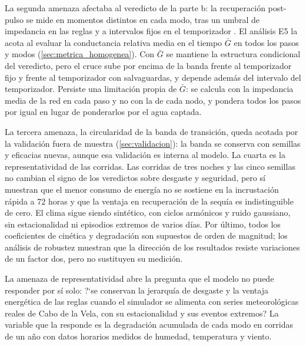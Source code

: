 La segunda amenaza afectaba al veredicto de la parte b: la recuperaci\'on post-pulso se mide en momentos distintos en cada modo, tras un umbral de impedancia en las reglas y a intervalos fijos en el temporizador \parencite[doc.~04, \S~7.5]{axioma2026engine}. El an\'alisis E5 la acota al evaluar la conductancia relativa media en el tiempo $\bar{G}$ en todos los pasos y modos (\cref{sec:metrica_homogenea}). Con $\bar{G}$ se mantiene la estructura condicional del veredicto, pero el cruce sube por encima de la banda frente al temporizador fijo y frente al temporizador con salvaguardas, y depende adem\'as del intervalo del temporizador. Persiste una limitaci\'on propia de $\bar{G}$: se calcula con la impedancia media de la red en cada paso y no con la de cada nodo, y pondera todos los pasos por igual en lugar de ponderarlos por el agua captada.

La tercera amenaza, la circularidad de la banda de transici\'on, queda acotada por la validaci\'on fuera de muestra (\cref{sec:validacion}): la banda se conserva con semillas y eficacias nuevas, aunque esa validaci\'on es interna al modelo. La cuarta es la representatividad de las corridas. Las corridas de tres noches y las cinco semillas no cambian el signo de los veredictos sobre desgaste y seguridad, pero s\'i muestran que el menor consumo de energ\'ia no se sostiene en la incrustaci\'on r\'apida a 72 horas y que la ventaja en recuperaci\'on de la sequ\'ia es indistinguible de cero. El clima sigue siendo sint\'etico, con ciclos arm\'onicos y ruido gaussiano, sin estacionalidad ni episodios extremos de varios d\'ias. Por \'ultimo, todos los coeficientes de cin\'etica y degradaci\'on son supuestos de orden de magnitud; los an\'alisis de robustez muestran que la direcci\'on de los resultados resiste variaciones de un factor dos, pero no sustituyen su medici\'on.

La amenaza de representatividad abre la pregunta que el modelo no puede responder por s\'i solo: ?`se conservan la jerarqu\'ia de desgaste y la ventaja energ\'etica de las reglas cuando el simulador se alimenta con series meteorol\'ogicas reales de Cabo de la Vela, con su estacionalidad y sus eventos extremos? La variable que la responde es la degradaci\'on acumulada de cada modo en corridas de un a\~no con datos horarios medidos de humedad, temperatura y viento.

